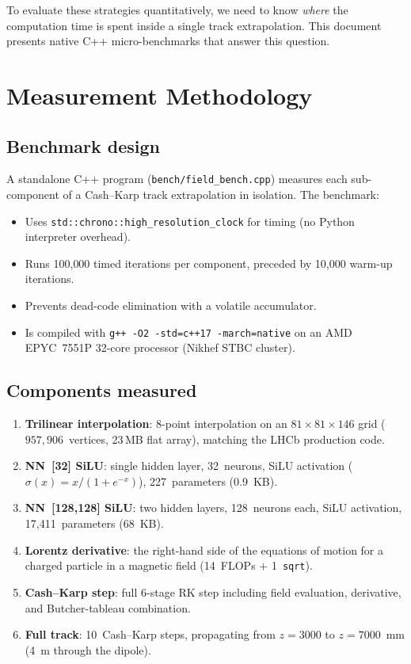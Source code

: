 \documentclass[11pt,a4paper]{article}
\newcommand{\SI}[2]{#1\,#2}
\begin{document}
To evaluate these strategies quantitatively, we need to know
\emph{where} the computation time is spent inside a single track
extrapolation.  This document presents native C++ micro-benchmarks that
answer this question.


\section{Measurement Methodology}
\label{sec:method}

\subsection{Benchmark design}

A standalone C++ program (\texttt{bench/field\_bench.cpp}) measures
each sub-component of a Cash--Karp track extrapolation in isolation.
The benchmark:
\begin{itemize}
    \item Uses \texttt{std::chrono::high\_resolution\_clock} for timing
          (no Python interpreter overhead).
    \item Runs 100{,}000 timed iterations per component, preceded
          by 10{,}000 warm-up iterations.
    \item Prevents dead-code elimination with a volatile accumulator.
    \item Is compiled with \texttt{g++ -O2 -std=c++17 -march=native}
          on an AMD EPYC~7551P 32-core processor (Nikhef STBC cluster).
\end{itemize}

\subsection{Components measured}

\begin{enumerate}
    \item \textbf{Trilinear interpolation}: 8-point interpolation on an
          $81 \times 81 \times 146$ grid ($957{,}906$~vertices,
          \SI{23}{MB} flat array), matching the LHCb production code.
    \item \textbf{NN~[32] SiLU}: single hidden layer, 32~neurons,
          SiLU activation ($\sigma(x) = x/(1+e^{-x})$), 227~parameters
          (0.9~KB).
    \item \textbf{NN~[128,128] SiLU}: two hidden layers, 128~neurons
          each, SiLU activation, 17{,}411~parameters (68~KB).
    \item \textbf{Lorentz derivative}: the right-hand side of the
          equations of motion for a charged particle in a magnetic field
          (14~FLOPs $+$ 1~\texttt{sqrt}).
    \item \textbf{Cash--Karp step}: full 6-stage RK step including
          field evaluation, derivative, and Butcher-tableau
          combination.
    \item \textbf{Full track}: 10~Cash--Karp steps, propagating
          from $z = 3000$ to $z = 7000$~mm (4~m through the dipole).
\end{enumerate}
\end{document}
